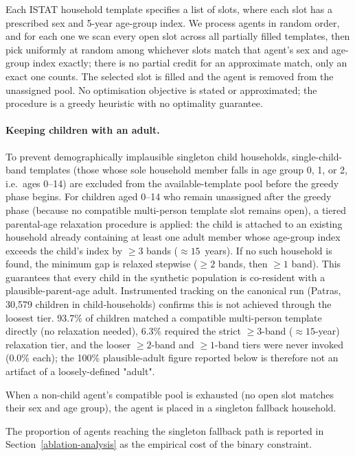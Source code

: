 \documentclass{article}
\begin{document}
Each ISTAT household template specifies a list of slots, where each slot has a prescribed sex and 5-year age-group index. We process agents in random order, and for each one we scan every open slot across all partially filled templates, then pick uniformly at random among whichever slots match that agent's sex and age-group index exactly; there is no partial credit for an approximate match, only an exact one counts. The selected slot is filled and the agent is removed from the unassigned pool. No optimisation objective is stated or approximated; the procedure is a greedy heuristic with no optimality guarantee.

\paragraph*{Keeping children with an adult.}
To prevent demographically implausible singleton child households, single-child-band templates (those whose sole household member falls in age group 0, 1, or 2, i.e.\ ages 0--14) are excluded from the available-template pool before the greedy phase begins. For children aged 0--14 who remain unassigned after the greedy phase (because no compatible multi-person template slot remains open), a tiered parental-age relaxation procedure is applied: the child is attached to an existing household already containing at least one adult member whose age-group index exceeds the child's index by $\geq 3$ bands ($\approx 15$~years). If no such household is found, the minimum gap is relaxed stepwise ($\geq 2$ bands, then $\geq 1$ band). This guarantees that every child in the synthetic population is co-resident with a plausible-parent-age adult. Instrumented tracking on the canonical run (Patras, 30,579 children in child-households) confirms this is not achieved through the loosest tier. 93.7\% of children matched a compatible multi-person template directly (no relaxation needed), 6.3\% required the strict $\geq 3$-band ($\approx 15$-year) relaxation tier, and the looser $\geq 2$-band and $\geq 1$-band tiers were never invoked (0.0\% each); the 100\% plausible-adult figure reported below is therefore not an artifact of a loosely-defined "adult".

When a non-child agent's compatible pool is exhausted (no open slot matches their sex and age group), the agent is placed in a singleton fallback household.

The proportion of agents reaching the singleton fallback path is reported in Section~\ref{ablation-analysis} as the empirical cost of the binary constraint.
\end{document}
